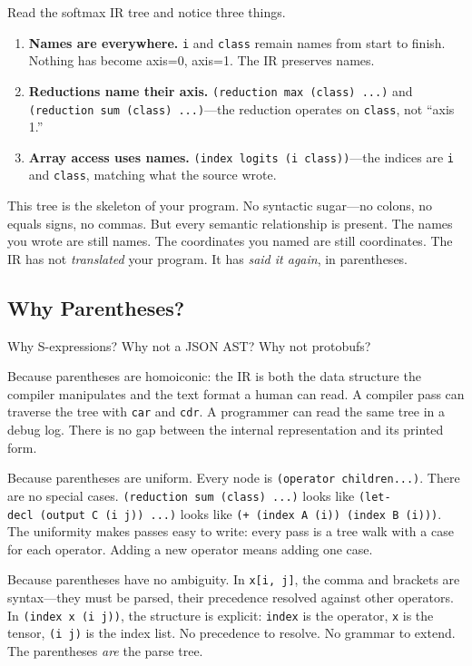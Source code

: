 \documentclass[11pt,titlepage]{article}
\begin{document}
Read the softmax IR tree and notice three things.

\begin{enumerate}
\def\labelenumi{\arabic{enumi}.}
\item
  \textbf{Names are everywhere.} \texttt{i} and \texttt{class} remain
  names from start to finish. Nothing has become axis=0, axis=1. The IR
  preserves names.
\item
  \textbf{Reductions name their axis.}
  \texttt{(reduction\ max\ (class)\ ...)} and
  \texttt{(reduction\ sum\ (class)\ ...)}---the reduction operates on
  \texttt{class}, not ``axis 1.''
\item
  \textbf{Array access uses names.}
  \texttt{(index\ logits\ (i\ class))}---the indices are \texttt{i} and
  \texttt{class}, matching what the source wrote.
\end{enumerate}

This tree is the skeleton of your program. No syntactic sugar---no
colons, no equals signs, no commas. But every semantic relationship is
present. The names you wrote are still names. The coordinates you named
are still coordinates. The IR has not \emph{translated} your program. It
has \emph{said it again}, in parentheses.

\vspace{2em}

\hypertarget{why-parentheses}{%
\subsection{Why Parentheses?}\label{why-parentheses}}

Why S-expressions? Why not a JSON AST? Why not protobufs?

Because parentheses are homoiconic: the IR is both the data structure
the compiler manipulates and the text format a human can read. A
compiler pass can traverse the tree with \texttt{car} and \texttt{cdr}.
A programmer can read the same tree in a debug log. There is no gap
between the internal representation and its printed form.

Because parentheses are uniform. Every node is
\texttt{(operator\ children...)}. There are no special cases.
\texttt{(reduction\ sum\ (class)\ ...)} looks like
\texttt{(let-decl\ (output\ C\ (i\ j))\ ...)} looks like
\texttt{(+\ (index\ A\ (i))\ (index\ B\ (i)))}. The uniformity makes
passes easy to write: every pass is a tree walk with a case for each
operator. Adding a new operator means adding one case.

Because parentheses have no ambiguity. In \texttt{x{[}i,\ j{]}}, the
comma and brackets are syntax---they must be parsed, their precedence
resolved against other operators. In \texttt{(index\ x\ (i\ j))}, the
structure is explicit: \texttt{index} is the operator, \texttt{x} is the
tensor, \texttt{(i\ j)} is the index list. No precedence to resolve. No
grammar to extend. The parentheses \emph{are} the parse tree.
\end{document}
